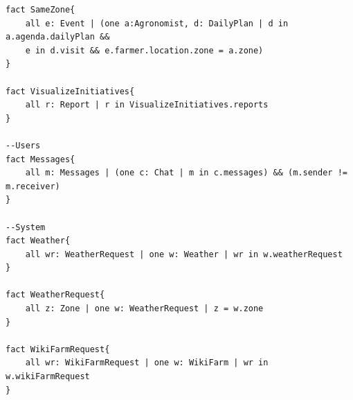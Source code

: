 \begin{lstlisting}[language=alloy]
fact SameZone{
	all e: Event | (one a:Agronomist, d: DailyPlan | d in a.agenda.dailyPlan && 
	e in d.visit && e.farmer.location.zone = a.zone)
}

fact VisualizeInitiatives{
	all r: Report | r in VisualizeInitiatives.reports
}

--Users
fact Messages{
	all m: Messages | (one c: Chat | m in c.messages) && (m.sender != m.receiver)
}

--System
fact Weather{
	all wr: WeatherRequest | one w: Weather | wr in w.weatherRequest	
}

fact WeatherRequest{
	all z: Zone | one w: WeatherRequest | z = w.zone
}

fact WikiFarmRequest{
	all wr: WikiFarmRequest | one w: WikiFarm | wr in w.wikiFarmRequest
}
\end{lstlisting}

\newpage
